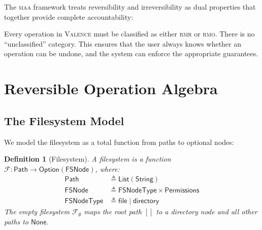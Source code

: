 \documentclass[11pt,a4paper]{article}
\newtheorem{definition}[theorem]{Definition}
\newcommand{\FS}{\mathcal{F}}
\newcommand{\valence}{\textsc{Valence}}
\newcommand{\rmr}{\textsc{rmr}}
\newcommand{\rmo}{\textsc{rmo}}
\newcommand{\maa}{\textsc{maa}}
\begin{document}
The \maa{} framework treats reversibility and irreversibility as dual
properties that together provide complete accountability:

\begin{center}
\end{center}

Every operation in \valence{} must be classified as either \rmr{} or \rmo{}.
There is no ``unclassified'' category. This ensures that the user always knows
whether an operation can be undone, and the system can enforce the appropriate
guarantees.

\section{Reversible Operation Algebra}
\label{sec:algebra}

\subsection{The Filesystem Model}

We model the filesystem as a total function from paths to optional nodes:

\begin{definition}[Filesystem]
\label{def:fs}
A \emph{filesystem} is a function $\FS : \mathsf{Path} \to
\mathsf{Option}(\mathsf{FSNode})$, where:
\begin{align*}
  \mathsf{Path}     &\triangleq \mathsf{List}(\mathsf{String}) \\
  \mathsf{FSNode}   &\triangleq \mathsf{FSNodeType} \times \mathsf{Permissions} \\
  \mathsf{FSNodeType} &\triangleq \mathsf{file} \mid \mathsf{directory}
\end{align*}
The empty filesystem $\FS_\emptyset$ maps the root path $[]$ to a directory
node and all other paths to $\mathsf{None}$.
\end{definition}
\end{document}
